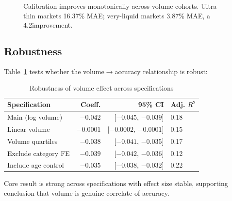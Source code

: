 \documentclass[a4paper,11pt]{article}
\theoremstyle{plain}
\theoremstyle{definition}
\begin{document}
\begin{figure}[h]
\centering
\small
{}
\caption{Calibration improves monotonically across volume cohorts. Ultra-thin markets 16.37\% MAE; very-liquid markets 3.87\% MAE, a 4.2\times improvement.}
\label{fig:volume_effect}
\end{figure}

\subsection{Robustness}

Table~\ref{tab:robustness_volume} tests whether the volume$\to$accuracy relationship is robust:

\begin{table}[h]
\centering
\caption{Robustness of volume effect across specifications}
\label{tab:robustness_volume}
\small
\begin{tabular}{lrrl}
\toprule
Specification & Coeff. & 95\% CI & Adj. $R^2$ \\
\midrule
Main (log volume) & $-0.042$ & [$-0.045$, $-0.039$] & 0.18 \\
Linear volume & $-0.0001$ & [$-0.0002$, $-0.0001$] & 0.15 \\
Volume quartiles & $-0.038$ & [$-0.041$, $-0.035$] & 0.17 \\
Exclude category FE & $-0.039$ & [$-0.042$, $-0.036$] & 0.12 \\
Include age control & $-0.035$ & [$-0.038$, $-0.032$] & 0.22 \\
\bottomrule
\end{tabular}
\end{table}

Core result is strong across specifications with effect size stable, supporting conclusion that volume is genuine correlate of accuracy.
\end{document}
